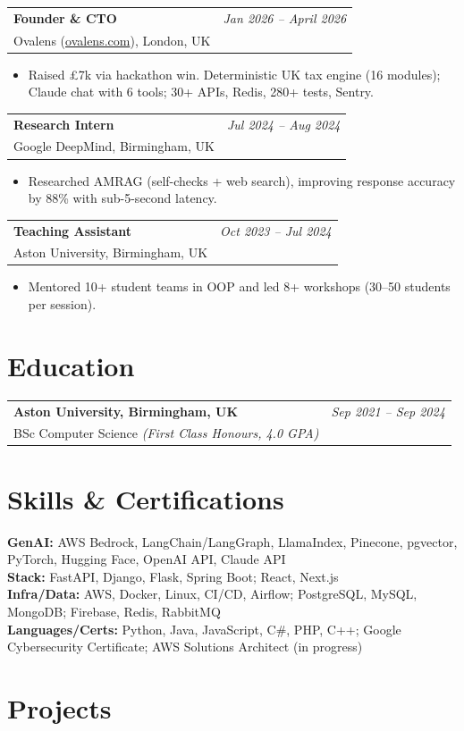 \documentclass[10pt,a4paper]{article}
\makeatletter
\newcommand{\cventry}[4]{%
  \begin{tabular*}{\textwidth}{@{}l@{\extracolsep{\fill}}r@{}}
    \textbf{#1} & \textit{#2} \\
    #3 & \textit{#4} \\
  \end{tabular*}
}
\newcommand{\cventryone}[3]{%
  \begin{tabular*}{\textwidth}{@{}l@{\extracolsep{\fill}}r@{}}
    \textbf{#1} & \textit{#2} \\
    #3 & \\
  \end{tabular*}
}
\newcommand{\smallgap}{\vspace{0.5pt}}
\makeatother
\begin{document}
\cventry{Founder \& CTO}{Jan 2026 -- April 2026}{Ovalens (\href{https://ovalens.com}{ovalens.com}), London, UK}{}
\begin{itemize}
  \item Raised \pounds7k via hackathon win. Deterministic UK tax engine (16 modules); Claude chat with 6 tools; 30+ APIs, Redis, 280+ tests, Sentry.
\end{itemize}
\smallgap

\cventry{Research Intern}{Jul 2024 -- Aug 2024}{Google DeepMind, Birmingham, UK}{}
\begin{itemize}
  \item Researched AMRAG (self-checks + web search), improving response accuracy by 88\% with sub-5-second latency.
\end{itemize}
\smallgap

\cventry{Teaching Assistant}{Oct 2023 -- Jul 2024}{Aston University, Birmingham, UK}{}
\begin{itemize}
  \item Mentored 10+ student teams in OOP and led 8+ workshops (30--50 students per session).
\end{itemize}

\section{Education}

\cventryone{Aston University, Birmingham, UK}{Sep 2021 -- Sep 2024}{BSc Computer Science \;\textit{(First Class Honours, 4.0 GPA)}}%

\section{Skills \& Certifications}

\textbf{GenAI:} AWS Bedrock, LangChain/LangGraph, LlamaIndex, Pinecone, pgvector, PyTorch, Hugging Face, OpenAI API, Claude API \\
\textbf{Stack:} FastAPI, Django, Flask, Spring Boot; React, Next.js \\
\textbf{Infra/Data:} AWS, Docker, Linux, CI/CD, Airflow; PostgreSQL, MySQL, MongoDB; Firebase, Redis, RabbitMQ \\
\textbf{Languages/Certs:} Python, Java, JavaScript, C\#, PHP, C++; Google Cybersecurity Certificate; AWS Solutions Architect (in progress)

\section{Projects}
\end{document}
